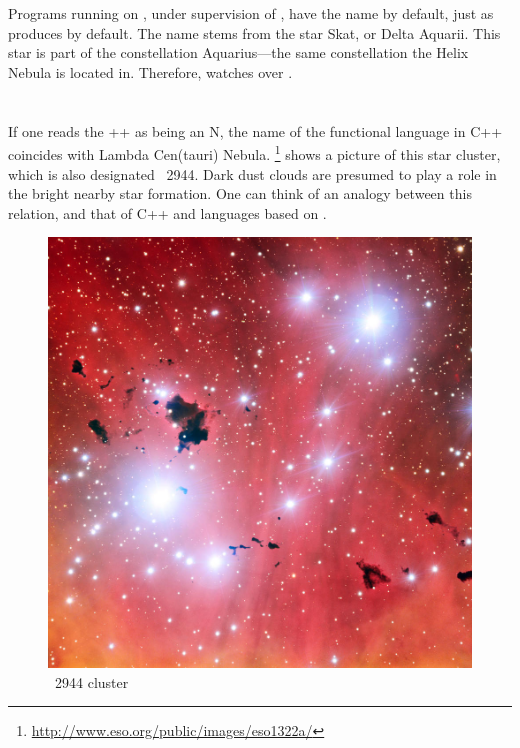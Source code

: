 \section{}

Programs running on \Starburst, under supervision of \Helix, have the name  by default, just as  produces  by default.
The name stems from the star Skat, or Delta Aquarii.
This star is part of the constellation Aquarius---the same constellation the Helix Nebula is located in.
Therefore, \Helix watches over .

\section{\ourfp}

If one reads the ++ as being an N, the name of the functional language in C++ coincides with Lambda Cen(tauri) Nebula.
\footnote{\url{http://www.eso.org/public/images/eso1322a/}} shows a picture of this star cluster, which is also designated ~2944.
Dark dust clouds are presumed to play a role in the bright nearby star formation.
One can think of an analogy between this relation, and that of C++ and languages based on \lcalc.

\begin{figure}%
\includegraphics[width=.7\linewidth]{figures/ety_lambda}%
\caption{~2944 cluster}%
\label{fig:ety:lambda}%
\end{figure}

